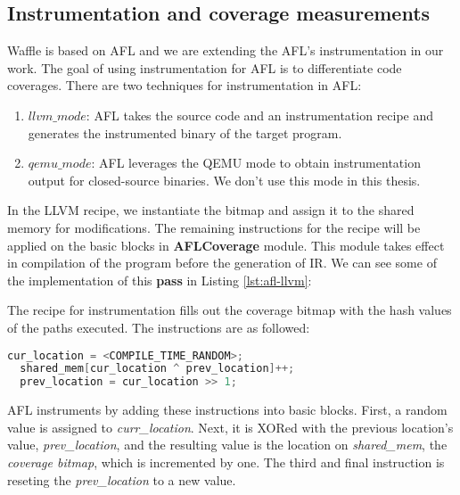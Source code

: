  
\subsection{Instrumentation and coverage measurements}
\label{instrumentation}

Waffle is based on AFL and we are extending the AFL's instrumentation in our work. The goal of using instrumentation for AFL is to differentiate code coverages. There are two techniques for instrumentation in AFL:

\begin{enumerate}
  \item \textit{$llvm\_mode$}: AFL takes the source code and an instrumentation recipe and generates the instrumented binary of the target program.
  \item \textit{$qemu\_mode$}: AFL leverages the QEMU mode to obtain instrumentation output for closed-source binaries. We don't use this mode in this thesis.
\end{enumerate}

In the LLVM recipe, we instantiate the bitmap and assign it to the shared memory for modifications. The remaining instructions for the recipe will be applied on the basic blocks in \textbf{AFLCoverage} module. This module takes effect in compilation of the program before the generation of IR. We can see some of the implementation of this \textbf{pass} in Listing \ref{lst:afl-llvm}:



The recipe for instrumentation fills out the coverage bitmap with the hash values of the paths executed. The instructions are as followed:

\begin{lstlisting}[language=C++,style=CodeStyle,label={lst:hash},caption={Select element and update in shared\_mem}]
  cur_location = <COMPILE_TIME_RANDOM>;
  shared_mem[cur_location ^ prev_location]++; 
  prev_location = cur_location >> 1;
\end{lstlisting}

AFL instruments by adding these instructions into basic blocks. First, a random value is assigned to \textit{curr\_location}. Next, it is XORed with the previous location's value, \textit{prev\_location}, and the resulting value is the location on \textit{shared\_mem}, the \textit{coverage bitmap}, which is incremented by one. The third and final instruction is reseting the \textit{prev\_location} to a new value.

